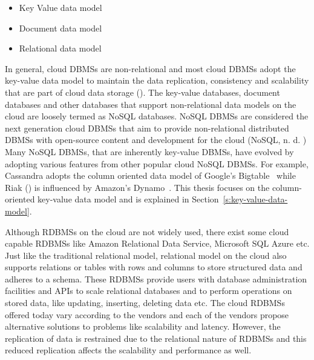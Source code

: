 \begin{itemize}
\item Key Value data model 

\item Document data model 

\item Relational data model
\end{itemize}

In general,   cloud \acp{DBMS} are non-relational and most cloud \acp{DBMS}
adopt the key-value data model to maintain the data replication,   consistency
and scalability that are part of cloud data storage (). The
key-value databases,   document databases and other databases that support
non-relational data models on the cloud are loosely termed as \ac{NoSQL}
databases.  \ac{NoSQL} \acp{DBMS} are considered the next generation cloud
\acp{DBMS} that aim to provide non-relational distributed \acp{DBMS} with
open-source content and development for the cloud (\ac{NoSQL},   n. d. ) Many
\ac{NoSQL} \acp{DBMS},   that are inherently key-value \acp{DBMS},   have
evolved by adopting various features from other popular cloud \ac{NoSQL}
\acp{DBMS}.  For example,   Cassandra adopts the column oriented data model of
Google's Bigtable~\citep{bigtable} while Riak () is influenced by
Amazon's Dynamo~\citep{Dynamo}.  This thesis focuses on the column-oriented
key-value data model and is explained in Section~\ref{s:key-value-data-model}.

Although \acp{RDBMS} on the cloud are not widely used,   there exist some cloud
capable \acp{RDBMS} like Amazon Relational Data Service,   Microsoft SQL Azure
etc.  Just like the traditional relational model,   relational model on the
cloud also supports relations or tables with rows and columns to store
structured data and adheres to a schema.  These \acp{RDBMS} provide users with
database administration facilities and APIs to scale relational databases and to
perform operations on stored data,   like updating,   inserting,   deleting data
etc.  The cloud \acp{RDBMS} offered today vary according to the vendors and each
of the vendors propose alternative solutions to problems like scalability and
latency.  However,   the replication of data is restrained due to the relational
nature of \acp{RDBMS} and this reduced replication affects the scalability and
performance as well.  

\newpage

